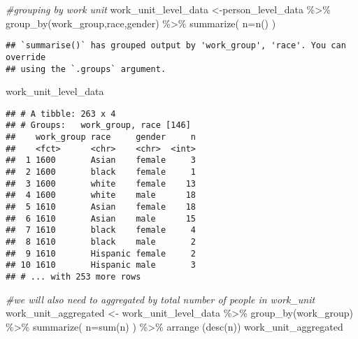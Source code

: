 \documentclass[
]{article}
\newenvironment{Shaded}{\begin{snugshade}}{\end{snugshade}}
\newcommand{\AttributeTok}[1]{\textcolor[rgb]{0.77,0.63,0.00}{#1}}
\newcommand{\CommentTok}[1]{\textcolor[rgb]{0.56,0.35,0.01}{\textit{#1}}}
\newcommand{\FunctionTok}[1]{\textcolor[rgb]{0.00,0.00,0.00}{#1}}
\newcommand{\NormalTok}[1]{#1}
\newcommand{\OtherTok}[1]{\textcolor[rgb]{0.56,0.35,0.01}{#1}}
\newcommand{\SpecialCharTok}[1]{\textcolor[rgb]{0.00,0.00,0.00}{#1}}
\begin{document}
\begin{Shaded}
\begin{Highlighting}[]
\CommentTok{\#grouping by work unit}
\NormalTok{work\_unit\_level\_data }\OtherTok{\textless{}{-}}\NormalTok{person\_level\_data }\SpecialCharTok{\%\textgreater{}\%}
  \FunctionTok{group\_by}\NormalTok{(work\_group,race,gender) }\SpecialCharTok{\%\textgreater{}\%}
  \FunctionTok{summarize}\NormalTok{(}
    \AttributeTok{n=}\FunctionTok{n}\NormalTok{()}
\NormalTok{  )}
\end{Highlighting}
\end{Shaded}

\begin{verbatim}
## `summarise()` has grouped output by 'work_group', 'race'. You can override
## using the `.groups` argument.
\end{verbatim}

\begin{Shaded}
\begin{Highlighting}[]
\NormalTok{work\_unit\_level\_data}
\end{Highlighting}
\end{Shaded}

\begin{verbatim}
## # A tibble: 263 x 4
## # Groups:   work_group, race [146]
##    work_group race     gender     n
##    <fct>      <chr>    <chr>  <int>
##  1 1600       Asian    female     3
##  2 1600       black    female     1
##  3 1600       white    female    13
##  4 1600       white    male      18
##  5 1610       Asian    female    18
##  6 1610       Asian    male      15
##  7 1610       black    female     4
##  8 1610       black    male       2
##  9 1610       Hispanic female     2
## 10 1610       Hispanic male       3
## # ... with 253 more rows
\end{verbatim}

\begin{Shaded}
\begin{Highlighting}[]
\CommentTok{\#we will also need to aggregated by total number of people in work\_unit}
\NormalTok{work\_unit\_aggregated }\OtherTok{\textless{}{-}}\NormalTok{ work\_unit\_level\_data }\SpecialCharTok{\%\textgreater{}\%}
  \FunctionTok{group\_by}\NormalTok{(work\_group) }\SpecialCharTok{\%\textgreater{}\%}
  \FunctionTok{summarize}\NormalTok{(}
    \AttributeTok{n=}\FunctionTok{sum}\NormalTok{(n)}
\NormalTok{  ) }\SpecialCharTok{\%\textgreater{}\%}
  \FunctionTok{arrange}\NormalTok{ (}\FunctionTok{desc}\NormalTok{(n))}
\NormalTok{work\_unit\_aggregated}
\end{Highlighting}
\end{Shaded}
\end{document}
